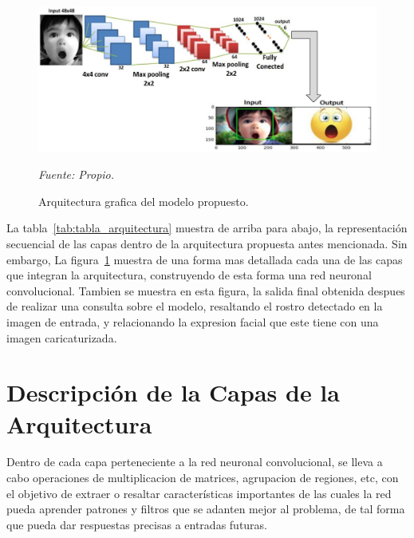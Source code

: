 \begin{figure}[H]
		\centering
		\includegraphics[width=180mm]{Imagenes/arquitectura_CNN_grafico.pdf}
		\caption{Arquitectura grafica del modelo propuesto.}
		\vspace{0.15cm}
		\textit{Fuente: Propio.}
		\label{fig:arquitectura_CNN_grafico}
\end{figure}

La tabla~\ref{tab:tabla_arquitectura} muestra de arriba para abajo, la representación secuencial de las capas dentro de la arquitectura propuesta antes mencionada. Sin embargo, La figura~\ref{fig:arquitectura_CNN_grafico} muestra de una forma mas detallada cada una de las capas que integran la arquitectura, construyendo de esta forma una red neuronal convolucional. Tambien se muestra en esta figura, la salida final obtenida despues de realizar una consulta sobre el modelo, resaltando el rostro detectado en la imagen de entrada, y relacionando la expresion facial que este tiene con una imagen caricaturizada.

\section{Descripción de la Capas de la Arquitectura}

Dentro de cada capa perteneciente a la red neuronal convolucional, se lleva a cabo operaciones de multiplicacion de matrices, agrupacion de regiones, etc, con el objetivo de extraer o resaltar características importantes de las cuales la red pueda aprender patrones y filtros que se adanten mejor al problema, de tal forma que pueda dar respuestas precisas a entradas futuras. 

